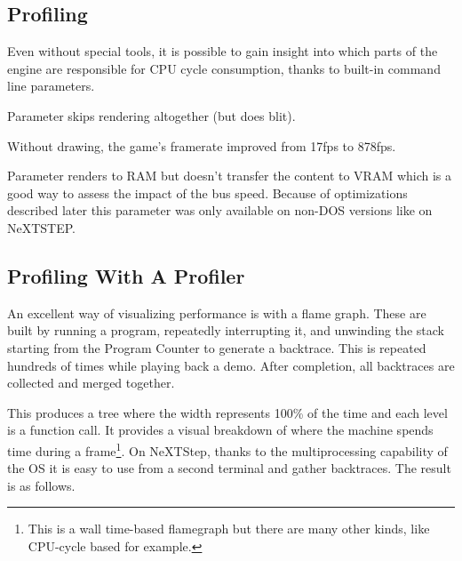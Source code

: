 \subsection{Profiling}
Even without special tools, it is possible to gain insight into which parts of the engine are responsible for CPU cycle consumption, thanks to built-in command line parameters.\\
\par
Parameter  skips rendering altogether (but does blit).\\
\par
\par
{}
\par
Without drawing, the game's framerate improved from 17fps to 878fps.\\
\par
Parameter  renders to RAM but doesn't transfer the content to VRAM which is a good way to assess the impact of the bus speed. Because of optimizations described later this parameter was only available on non-DOS versions like on NeXTSTEP.\\
\par
{}


\vspace{-10mm}
\subsection{Profiling With A Profiler}
An excellent way of visualizing performance is with a flame graph. These are built by running a program, repeatedly interrupting it, and unwinding the stack starting from the Program Counter to generate a backtrace. This is repeated hundreds of times while playing back a demo. After completion, all backtraces are collected and merged together.\\
\par
 This produces a tree where the width represents 100\% of the time and each level is a function call. It provides a visual breakdown of where the machine spends time during a frame\footnote{This is a wall time-based flamegraph but there are many other kinds, like CPU-cycle based for example.}. On NeXTStep, thanks to the multiprocessing capability of the OS it is easy to use  from a second terminal and gather backtraces. The result is as follows.\\
\par

